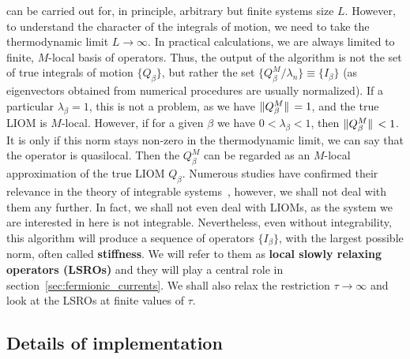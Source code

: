 can be carried out for, in principle, arbitrary but finite systems size \(L\). However,
to understand the character of the integrals of motion, we need to take the thermodynamic
limit \(L\to\infty\). In practical calculations, we are always limited to finite, \(M\)-local basis
of operators. Thus, the output of the algorithm is not the set of true integrals of motion \(\{Q_{\beta}\}\),
but rather the set \(\{Q_{\beta}^M/\lambda_n\} \equiv \{I_{\beta}\}\) (as eigenvectors obtained from numerical
procedures are usually normalized). If a particular \(\lambda_{\beta} = 1\), this
is not a problem, as we have \(\norm*{Q^M_{\beta}} = 1\), and the true LIOM is \(M\)-local. However, if
for a given \({\beta}\) we have \(0 < \lambda_{\beta} < 1\), then \(\norm*{Q^M_{\beta}} < 1\). It is only if this norm
stays non-zero in the thermodynamic limit, we can say that the operator is quasilocal. Then the \(Q_{\beta}^M\)
can be regarded as an \(M\)-local approximation of the true LIOM \(Q_{\beta}\).
Numerous studies have confirmed their relevance in the theory of integrable
systems~\autocite{Ilievski2015, Ilievski2015a, Prosen2013, Prosen2014},
however, we shall not deal with them any further. In fact, we shall not even deal with LIOMs, as
the system we are interested in here is not integrable. Nevertheless, even without integrability,
this algorithm will produce a sequence of operators \(\{I_{\beta}\}\), with the largest possible norm,
often called \textbf{stiffness}. We will refer to them as \textbf{local slowly relaxing operators (LSROs)}
and they will play a central role in section~\ref{sec:fermionic_currents}. We shall also relax the restriction
\(\tau\to\infty\) and look at the LSROs at finite values of \(\tau\).

\subsection{Details of implementation}

